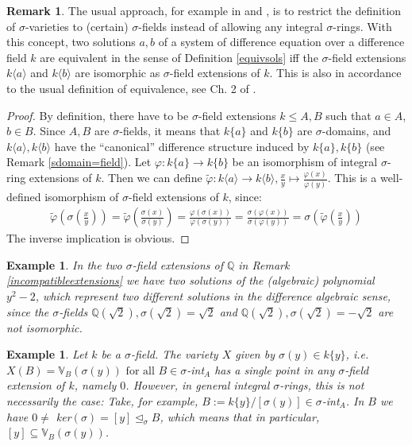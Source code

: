 \documentclass{article}
\def\Q{\mathbb{Q}}
\def\VV{\mathbb{V}}
\def\s{\sigma}
\def\si{\unlhd_{\sigma}}
\def\fa{\text{ for all }}
\newenvironment{bew}{\begin{proof}[Proof]}{\end{proof}}
\theoremstyle{plain}
\newtheorem{ex}[Satz]{Example}
\theoremstyle{definition}
\newtheorem{rem}[Satz]{Remark}
\begin{document}
\begin{rem}
The usual approach, for example in \cite{cohn} and \cite{levin}, is to restrict the definition of $\s$-varieties to (certain) $\s$-fields instead of allowing any integral $\s$-rings. With this concept,
two solutions $a,b$ of a system of difference equation over a difference field $k$ are equivalent in the sense of Definition \ref{equivsols} iff the $\s$-field extensions $k\langle a \rangle$ and $k\langle b \rangle$ are isomorphic as $\s$-field extensions of $k$.
This is also in accordance to the usual definition of equivalence, see Ch. 2 of \cite{wibmer}.
\begin{bew}
By definition, there have to be $\s$-field extensions $k \leq A,B$ such that $a \in A$, $b \in B$. Since $A,B$ are $\s$-fields, it means that $k\{a\}$ and $k\{b\}$ are $\s$-domains, 
and $k\langle a \rangle, k\langle b \rangle$ have the ``canonical'' difference structure induced by $k\{a\}, k\{b\}$ (see Remark \ref{sdomain=field}). Let $\varphi: k\{a\} \rightarrow k\{b\}$ be an isomorphism of integral $\s$-ring extensions of $k$.
Then we can define $\tilde \varphi: k \langle a \rangle \rightarrow k\langle b \rangle, \frac{x}{y} \mapsto \frac{\varphi(x)}{\varphi{(y)}}$. This is a well-defined isomorphism of $\s$-field extensions of $k$, since:
\begin{align*}
\tilde \varphi (\s (\frac{x}{y})) = \tilde \varphi( \frac{\s(x)}{\s(y)}) = \frac{ \varphi (\s (x))}{ \varphi (\s(y))} =  \frac{\s (\varphi (x))}{\s (\varphi(y))} = \s( \tilde \varphi (\frac{x}{y}))
\end{align*}
The inverse implication is obvious.
\end{bew}
\end{rem}

\begin{ex}
In the two $\s$-field extensions of $\Q$ in Remark \ref{incompatibleextensions} we have two solutions of the (algebraic) polynomial $y^2-2$, which represent two different solutions in the difference algebraic sense,
since the $\s$-fields $\Q(\sqrt{2}), \s(\sqrt{2}) = \sqrt{2}$ and $\Q(\sqrt{2}), \s(\sqrt{2}) = -\sqrt{2}$ are not isomorphic. 
\end{ex}

\begin{ex}
Let $k$ be a $\s$-field. The variety $X$ given by $\s(y) \in k\{y\}$, i.e. $X(B) = \VV_B(\s(y)) \fa B \in \s$-int$_A$ has a single point in any $\s$-field extension of $k$, namely $0$. However, in general integral $\s$-rings,
this is not necessarily the case: Take, for example, $B:= k\{y\}/[\s(y)] \in \s$-int$_A$. In $B$ we have $0 \neq $ ker$(\s) = [y] \si B$, which means that in particular, $[y] \subseteq \VV_B(\s(y))$.
\end{ex}
\end{document}
